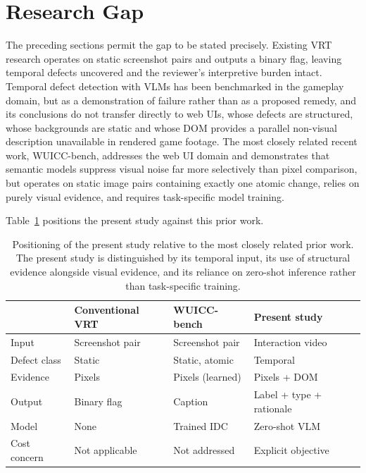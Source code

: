 \section{Research Gap}
\label{sec:gap}

The preceding sections permit the gap to be stated precisely. Existing
VRT research operates on static screenshot pairs and outputs a binary
flag, leaving temporal defects uncovered and the reviewer's interpretive
burden intact. Temporal defect detection with VLMs has been benchmarked in
the gameplay domain, but as a demonstration of failure rather than as a
proposed remedy, and its conclusions do not transfer directly to web UIs,
whose defects are structured, whose backgrounds are static and whose DOM
provides a parallel non-visual description unavailable in rendered game
footage. The most closely related recent work, WUICC-bench, addresses the
web UI domain and demonstrates that semantic models suppress visual noise
far more selectively than pixel comparison, but operates on static image
pairs containing exactly one atomic change, relies on purely visual
evidence, and requires task-specific model training.

Table~\ref{tab:gap} positions the present study against this prior work.

\begin{table}[htbp]
\centering
\caption{Positioning of the present study relative to the most closely
related prior work. The present study is distinguished by its temporal
input, its use of structural evidence alongside visual evidence, and its
reliance on zero-shot inference rather than task-specific training.}
\label{tab:gap}
\begin{tabular}{@{}llll@{}}
\toprule
 & Conventional VRT & WUICC-bench & Present study \\
\midrule
Input          & Screenshot pair   & Screenshot pair   & Interaction video \\
Defect class   & Static            & Static, atomic    & Temporal \\
Evidence       & Pixels            & Pixels (learned)  & Pixels + DOM \\
Output         & Binary flag       & Caption           & Label + type + rationale \\
Model          & None              & Trained IDC       & Zero-shot VLM \\
Cost concern   & Not applicable    & Not addressed     & Explicit objective \\
\bottomrule
\end{tabular}
\end{table}


